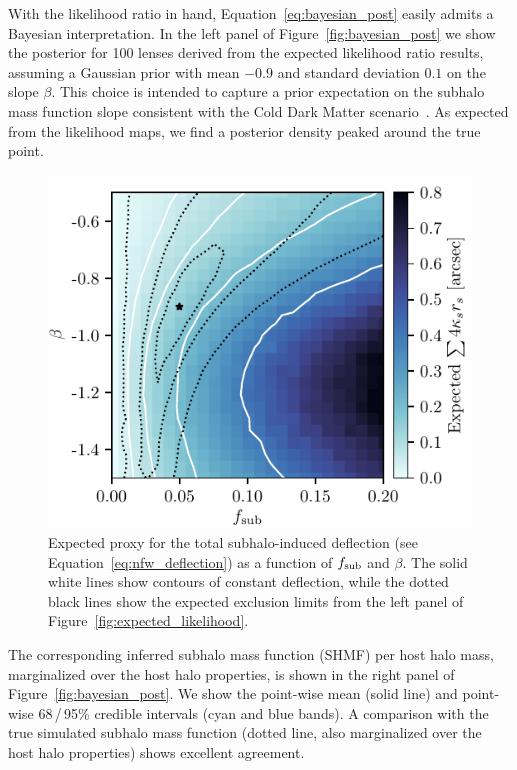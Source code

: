\documentclass[twocolumn]{aastex63}
\begin{document}
With the likelihood ratio in hand, Equation~\eqref{eq:bayesian_post} easily admits a Bayesian interpretation. In the left panel of Figure~\ref{fig:bayesian_post} we show the posterior for 100 lenses derived from the expected likelihood ratio results, assuming a Gaussian prior with mean $-0.9$ and standard deviation $0.1$ on the slope $\beta$. This choice is intended to capture a prior expectation on the subhalo mass function slope consistent with the Cold Dark Matter scenario~\citep[\eg,][]{0802.2265,0809.0898}. As expected from the likelihood maps, we find a posterior density peaked around the true point.

\begin{figure}
\centering
\includegraphics[height=0.4\textwidth]{figures/warum_ist_die_banane_krumm}  %
\caption{Expected proxy for the total subhalo-induced deflection (see Equation~\eqref{eq:nfw_deflection}) as a function of $f_{\mathrm{sub}}$ and $\beta$. The solid white lines show contours of constant deflection, while the dotted black lines show the expected exclusion limits from the left panel of Figure~\ref{fig:expected_likelihood}. }
\label{fig:banana}
\end{figure}

The corresponding inferred subhalo mass function (SHMF) per host halo mass, marginalized over the host halo properties, is shown in the right panel of Figure~\ref{fig:bayesian_post}. We show the point-wise mean (solid line) and point-wise 68\,/\,95\% credible intervals (cyan and blue bands). A comparison with the true simulated subhalo mass function (dotted line, also marginalized over the host halo properties) shows excellent agreement.
\end{document}
